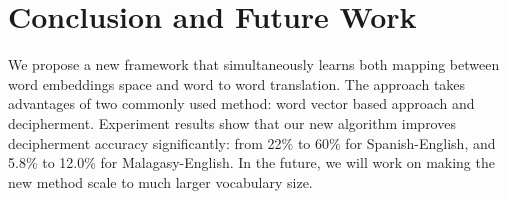 \section{Conclusion and Future Work}
We propose a new framework that simultaneously learns both mapping between word embeddings space and word to word translation. The approach takes advantages of two commonly used method: word vector based approach and decipherment. Experiment results show that our new algorithm improves decipherment accuracy significantly: from 22\% to 60\% for Spanish-English, and 5.8\% to 12.0\% for Malagasy-English. In the future, we will work on making the new method scale to much larger vocabulary size.